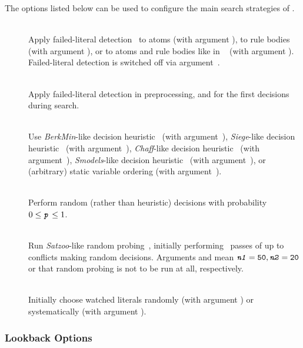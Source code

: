 The options listed below can be used to configure the main search
strategies of \clasp.
%
\begin{description}
\item[]~\\
Apply failed-literal detection~\cite{freeman95}
to atoms (with argument ),
to rule bodies (with argument ), or
to atoms and rule bodies like in \nomorepp~\cite{angelinesc05c} (with argument ).
Failed-literal detection is switched off via argument~.
\item[]~\\
Apply failed-literal detection in preprocessing,
and for the first  decisions during search.
\item[]~\\
Use \emph{BerkMin}-like decision heuristic~\cite{golnov02a}
(with argument~),
\emph{Siege}-like decision heuristic~\cite{ryan04a}
(with argument~),
\emph{Chaff}-like decision heuristic~\cite{momazhzhma01a}
(with argument~),
\emph{Smodels}-like decision heuristic~\cite{siniso02a}
(with argument~),
or (arbitrary) static variable ordering
(with argument~).
\item[]~\\
Perform random (rather than heuristic) decisions
with probability $0\leq\texttt{\textit{p}}\leq 1$.
\item[]~\\
Run \emph{Satzoo}-like random probing~\cite{een03a},
initially performing~ passes of up to~ conflicts
making random decisions.
Arguments  and  mean
$\code{\textit{n1}}=\code{50},\linebreak[1]\code{\textit{n2}}=\code{20}$
or that random probing is not to be run at all, respectively.
\item[]~\\
Initially choose watched literals randomly (with argument )
or systematically (with argument ).
\end{description}

\subsubsection{Lookback Options}\label{subsec:clasp:back}


